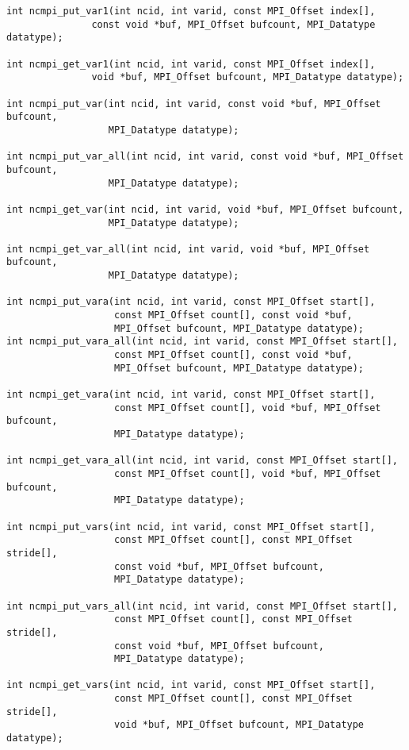 \begin{verbatim}
int ncmpi_put_var1(int ncid, int varid, const MPI_Offset index[],
               const void *buf, MPI_Offset bufcount, MPI_Datatype datatype);

int ncmpi_get_var1(int ncid, int varid, const MPI_Offset index[],
               void *buf, MPI_Offset bufcount, MPI_Datatype datatype);

int ncmpi_put_var(int ncid, int varid, const void *buf, MPI_Offset bufcount,
                  MPI_Datatype datatype);

int ncmpi_put_var_all(int ncid, int varid, const void *buf, MPI_Offset bufcount,
                  MPI_Datatype datatype);

int ncmpi_get_var(int ncid, int varid, void *buf, MPI_Offset bufcount,
                  MPI_Datatype datatype);

int ncmpi_get_var_all(int ncid, int varid, void *buf, MPI_Offset bufcount,
                  MPI_Datatype datatype);

int ncmpi_put_vara(int ncid, int varid, const MPI_Offset start[],
                   const MPI_Offset count[], const void *buf,
                   MPI_Offset bufcount, MPI_Datatype datatype);
int ncmpi_put_vara_all(int ncid, int varid, const MPI_Offset start[],
                   const MPI_Offset count[], const void *buf,
                   MPI_Offset bufcount, MPI_Datatype datatype);

int ncmpi_get_vara(int ncid, int varid, const MPI_Offset start[],
                   const MPI_Offset count[], void *buf, MPI_Offset bufcount,
                   MPI_Datatype datatype);

int ncmpi_get_vara_all(int ncid, int varid, const MPI_Offset start[],
                   const MPI_Offset count[], void *buf, MPI_Offset bufcount,
                   MPI_Datatype datatype);

int ncmpi_put_vars(int ncid, int varid, const MPI_Offset start[],
                   const MPI_Offset count[], const MPI_Offset stride[],
                   const void *buf, MPI_Offset bufcount,
                   MPI_Datatype datatype); 

int ncmpi_put_vars_all(int ncid, int varid, const MPI_Offset start[],
                   const MPI_Offset count[], const MPI_Offset stride[],
                   const void *buf, MPI_Offset bufcount,
                   MPI_Datatype datatype); 

int ncmpi_get_vars(int ncid, int varid, const MPI_Offset start[],
                   const MPI_Offset count[], const MPI_Offset stride[],
                   void *buf, MPI_Offset bufcount, MPI_Datatype datatype); 


\end{verbatim}
